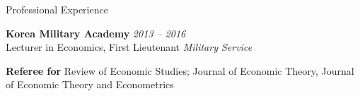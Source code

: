 
\begin{rSection}{Professional Experience}

{\bf Korea Military Academy} \hfill {\em 2013 -- 2016} \\[5pt] 
Lecturer in Economics, First Lieutenant \hfill {\em Military Service}

\medskip 

{\bf Referee for } Review of Economic Studies; Journal of Economic Theory, Journal of Economic Theory and Econometrics

\end{rSection}